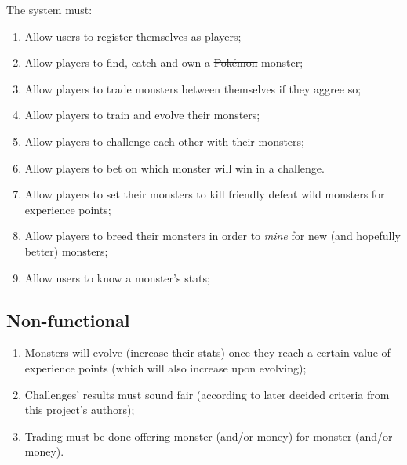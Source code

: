 \documentclass{article}
\begin{document}
    The system must:

    \begin{enumerate}
        \item Allow users to register themselves as players;
        \item Allow players to find, catch and own a \st{Pokémon} monster;
        \item Allow players to trade monsters between themselves if they aggree
              so;
        \item Allow players to train and evolve their monsters;
        \item Allow players to challenge each other with their monsters;
        \item Allow players to bet on which monster will win in a challenge.
        \item Allow players to set their monsters to \st{kill} friendly defeat
              wild monsters for experience points;
        \item Allow players to breed their monsters in order to \textit{mine}
              for new (and hopefully better) monsters;
        \item Allow users to know a monster's stats;
    \end{enumerate}

    \subsection{Non-functional}

    \begin{enumerate}
        \item Monsters will evolve (increase their stats) once they reach a
              certain value of experience points (which will also increase upon
              evolving);
        \item Challenges' results must sound fair (according to later decided
              criteria from this project's authors);
        \item Trading must be done offering monster (and/or money) for monster
              (and/or money).
    \end{enumerate}
\end{document}
